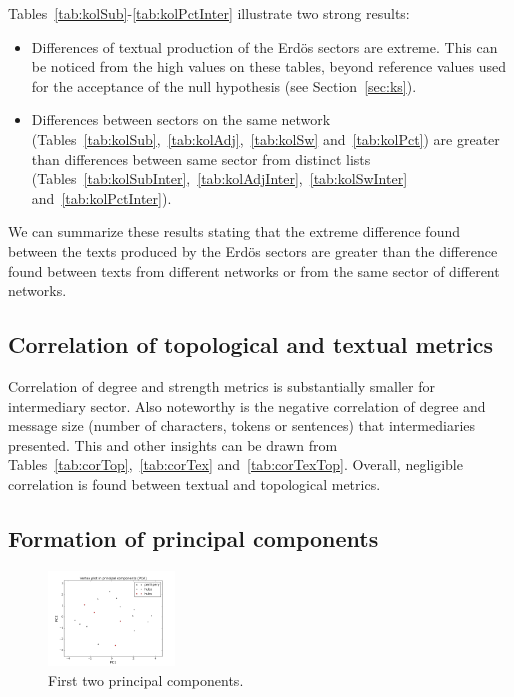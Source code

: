 Tables~\ref{tab:kolSub}-\ref{tab:kolPctInter}
illustrate two strong results:
\begin{itemize}
    \item Differences of textual production of the Erd\"os sectors are extreme.
	    This can be noticed from the high values on these tables,
	    beyond reference values used for the acceptance of the 
	    null hypothesis (see Section~\ref{sec:ks}).
    \item Differences between sectors on the same network 
	    (Tables~\ref{tab:kolSub},~\ref{tab:kolAdj},~\ref{tab:kolSw} and~\ref{tab:kolPct}) are greater than differences between same sector from distinct lists (Tables~\ref{tab:kolSubInter},~\ref{tab:kolAdjInter},~\ref{tab:kolSwInter} and~\ref{tab:kolPctInter}).
\end{itemize}

We can summarize these results stating that the extreme difference
found between the texts produced by the Erd\"os sectors
are greater than the difference found between texts from different
networks or from the same sector of different networks.

\subsection{Correlation of topological and textual metrics}\label{subsec:cor}


Correlation of degree 
and strength metrics is
substantially smaller for intermediary sector.
Also noteworthy is the negative correlation of degree and message size (number of characters, tokens or sentences) that intermediaries presented.
This and other insights can be drawn from Tables~\ref{tab:corTop},~\ref{tab:corTex} and~\ref{tab:corTexTop}.
Overall, negligible correlation is found between textual and topological metrics.

\subsection{Formation of principal components}\label{subsec:pc}

\begin{figure}[!h]
	\centering
	\includegraphics[width=0.3\textwidth]{figs/plot_pca}
	\caption{First two principal components.}
	\label{fig:formation}
\end{figure}



